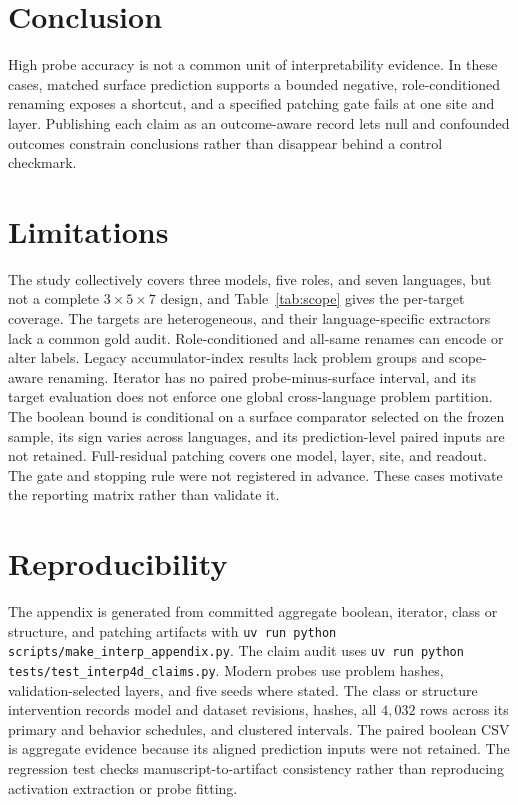\documentclass{article}
\begin{document}
\section{Conclusion}

High probe accuracy is not a common unit of interpretability evidence. In
these cases, matched surface prediction supports a bounded negative,
role-conditioned renaming exposes a shortcut, and a specified patching gate
fails at one site and layer. Publishing each claim as an outcome-aware
record lets null and confounded outcomes constrain conclusions rather than
disappear behind a control checkmark.

\section{Limitations}

The study collectively covers three models, five roles, and seven languages,
but not a complete $3\times5\times7$ design, and Table~\ref{tab:scope} gives
the per-target coverage. The targets are heterogeneous, and their
language-specific extractors lack a common gold audit. Role-conditioned and
all-same renames can encode or alter labels. Legacy accumulator-index results
lack problem groups and scope-aware renaming. Iterator has no paired
probe-minus-surface interval, and its target evaluation does not enforce one
global cross-language problem partition. The boolean bound is conditional on a
surface comparator selected on the frozen sample, its sign varies across
languages, and its prediction-level paired inputs are not retained.
Full-residual patching covers one model, layer, site, and readout. The gate and stopping rule were not
registered in advance. These cases motivate the reporting matrix rather than
validate it.




\appendix
\raggedbottom


\FloatBarrier
{}
\section{Reproducibility}
\label{app:repro}
The appendix is generated from committed aggregate boolean, iterator, class or
structure, and patching artifacts with
\texttt{uv run python scripts/make\_interp\_appendix.py}. The claim audit uses
\texttt{uv run python tests/test\_interp4d\_claims.py}. Modern probes use
problem hashes, validation-selected layers, and five seeds where stated. The
class or structure intervention records model and dataset revisions, hashes,
all $4{,}032$ rows across its primary and behavior schedules, and clustered
intervals. The paired boolean CSV is
aggregate evidence because its aligned prediction inputs were not retained.
The regression test checks manuscript-to-artifact consistency rather than
reproducing activation extraction or probe fitting.
\end{document}
